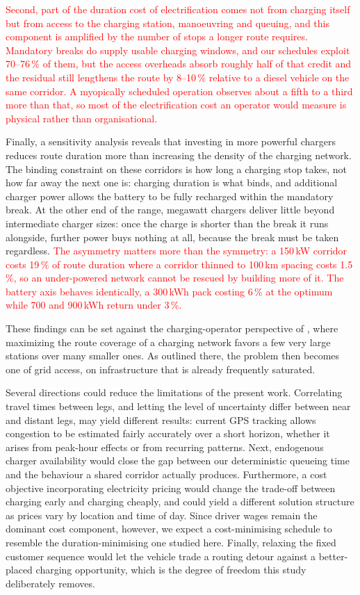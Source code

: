 \documentclass[preprint,12pt,3p]{elsarticle}
\newcommand{\red}[1]{\textcolor{red}{#1}}
\begin{document}
\red{Second, part of the duration cost of electrification comes not from
charging itself but from access to the charging station, manoeuvring and
queuing, and this component is amplified by the number of stops a longer route
requires. Mandatory breaks do supply usable charging windows, and our schedules
exploit 70--76\,\% of them, but the access overheads absorb roughly half of that
credit and the residual still lengthens the route by 8--10\,\% relative to a
diesel vehicle on the same corridor. A myopically scheduled operation observes
about a fifth to a third more than that, so most of the electrification cost an
operator would measure is physical rather than organisational.}

Finally, a sensitivity analysis reveals that investing in more powerful chargers reduces route duration more than increasing the density of the charging network. The binding constraint on these corridors is how long a charging stop takes, not how far away the next one is: charging duration is what binds, and additional charger power allows the battery to be fully recharged within the mandatory break. At the other end of the range, megawatt chargers deliver little beyond intermediate charger sizes: once the charge is shorter than the break it runs alongside, further power buys nothing at all, because the break must be taken regardless. \red{The asymmetry matters more than the symmetry: a 150\,kW corridor costs 19\,\% of route duration where a corridor thinned to 100\,km spacing costs 1.5\,\%, so an under-powered network cannot be rescued by building more of it. The battery axis behaves identically, a 300\,kWh pack costing 6\,\% at the optimum while 700 and 900\,kWh return under 3\,\%.}

These findings can be set against the charging-operator perspective of \citet{pagnier_charging_2026}, where maximizing the route coverage of a charging network favors a few very large stations over many smaller ones. As outlined there, the problem then becomes one of grid access, on infrastructure that is already frequently saturated.

Several directions could reduce the limitations of the present work. Correlating travel times between legs, and letting the level of uncertainty differ between near and distant legs, may yield different results: current GPS tracking allows congestion to be estimated fairly accurately over a short horizon, whether it arises from peak-hour effects or from recurring patterns.
Next, endogenous charger availability would close the gap between our deterministic queueing time and the behaviour a shared corridor actually produces.
Furthermore, a cost objective incorporating electricity pricing would change the trade-off between charging early and charging cheaply, and could yield a different solution structure as prices vary by location and time of day. Since driver wages remain the dominant cost component, however, we expect a cost-minimising schedule to resemble the duration-minimising one studied here.
Finally, relaxing the fixed customer sequence would let the vehicle trade a routing detour against a better-placed charging opportunity, which is the degree of freedom this study deliberately removes.
\end{document}
